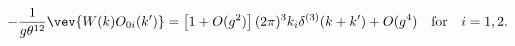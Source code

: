 \begin{equation}
  -\frac{1}{g \theta^{12}} \vev{W(k)O_{0i}(k')}
  = \left[ 1 + O(g^2) \right]
  (2\pi)^3 k_i \delta^{(3)}(k+k') + O(g^4)
  \quad {\rm for} \quad i=1,2.
\end{equation}

